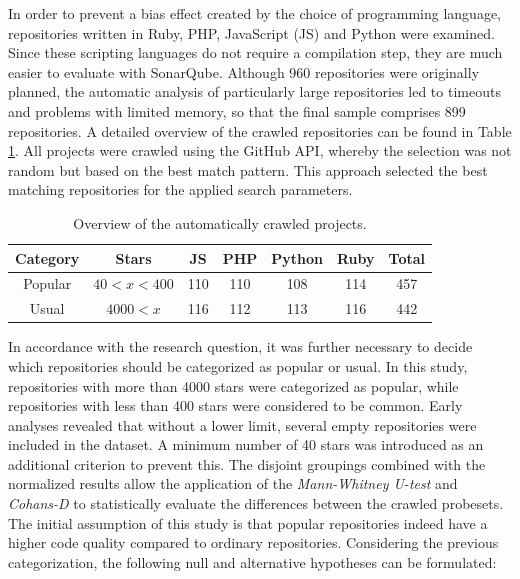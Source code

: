 \documentclass[a4paper, 12pt]{article}
\begin{document}
In order to prevent a bias effect created by the choice of programming language, repositories written in Ruby, PHP, JavaScript (JS) and Python were examined. Since these scripting languages do not require a compilation step, they are much easier to evaluate with SonarQube. Although 960 repositories were originally planned, the automatic analysis of particularly large repositories led to timeouts and problems with limited memory, so that the final sample comprises 899 repositories. A detailed overview of the crawled repositories can be found in Table \ref{tab:repo_counts}. All projects were crawled using the GitHub API\autocite{GitHub-Api}, whereby the selection was not random but based on the best match pattern. This approach selected the best matching repositories for the applied search parameters.

\begin{table}[ht]
\centering
\begin{tabular}{|c|c|c|c|c|c|c|}
\hline
\textbf{Category} & \textbf{Stars} & \textbf{JS} & \textbf{PHP} & \textbf{Python} & \textbf{Ruby} & \textbf{Total} \\
\hline
Popular & $40 < x < 400$ & 110 & 110 & 108 & 114 & 457\\
\hline
Usual & $ 4000 < x $ & 116 & 112 & 113 & 116 & 442 \\
\hline
\end{tabular}
\caption{Overview of the automatically crawled projects.}
\label{tab:repo_counts}
\end{table}

In accordance with the research question, it was further necessary to decide which repositories should be categorized as popular or usual. In this study, repositories with more than 4000 stars were categorized as popular, while repositories with less than 400 stars were considered to be common. Early analyses revealed that without a lower limit, several empty repositories were included in the dataset. A minimum number of 40 stars was introduced as an additional criterion to prevent this. The disjoint groupings combined with the normalized results allow the application of the \textit{Mann-Whitney U-test} and \textit{Cohans-D} to statistically evaluate the differences between the crawled probesets.\\

The initial assumption of this study is that popular repositories indeed have a higher code quality compared to ordinary repositories. Considering the previous categorization, the following null and alternative hypotheses can be formulated:
\end{document}
